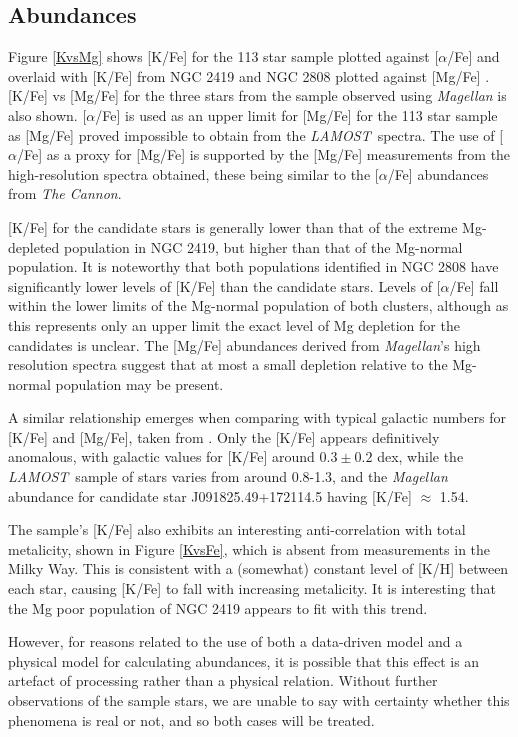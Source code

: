 \documentclass[a4paper,fleqn,usenatbib]{mnras}
\newcommand{\project}[1]{\emph{#1}}
\newcommand{\lamost}{\project{LAMOST}}
\newcommand{\tc}{\project{The Cannon}}
\begin{document}
\subsection{Abundances}

Figure \ref{KvsMg} shows [K/Fe]  for the 113 star sample plotted against $[\alpha$/Fe] and overlaid with [K/Fe] from NGC 2419 and NGC 2808 plotted against [Mg/Fe] \citep{cohenkirby2012,mucciarelli2012,mucciarelli2015}. [K/Fe] vs [Mg/Fe] for the three stars from the sample observed using \textit{Magellan} is also shown. $[\alpha$/Fe] is used as an upper limit for [Mg/Fe] for the 113 star sample as [Mg/Fe] proved impossible to obtain from the \lamost \ spectra. The use of [$\alpha$/Fe] as a proxy for [Mg/Fe] is supported by the [Mg/Fe] measurements from the high-resolution spectra obtained, these being similar to the [$\alpha$/Fe] abundances from \tc.

[K/Fe] for the candidate stars is generally lower than that of the extreme Mg-depleted population in NGC 2419, but higher than that of the Mg-normal population. It is noteworthy that both populations identified in NGC 2808 have significantly lower levels of [K/Fe] than the candidate stars.
Levels of [$\alpha$/Fe] fall within the lower limits of the Mg-normal population of both clusters, although as this represents only an upper limit the exact level of Mg depletion for the candidates is unclear. The [Mg/Fe] abundances derived from \textit{Magellan}'s high resolution spectra suggest that at most a small depletion relative to the Mg-normal population may be present.

A similar relationship emerges when comparing with typical galactic numbers for [K/Fe] and [Mg/Fe], taken from \cite{kobayashi2011}.
Only the [K/Fe] appears definitively anomalous, with galactic values for [K/Fe] around $0.3 \pm 0.2$ dex, while the \lamost \ sample of stars varies from around 0.8-1.3, and the \textit{Magellan} abundance for candidate star J091825.49+172114.5 having [K/Fe] $\approx$ 1.54.

The sample's [K/Fe] also exhibits an interesting anti-correlation with total metalicity, shown in Figure \ref{KvsFe}, which is absent from measurements in the Milky Way. This is consistent with a (somewhat) constant level of [K/H] between each star, causing [K/Fe] to fall with increasing metalicity. It is interesting that the Mg poor population of NGC 2419 appears to fit with this trend.

 However, for reasons related to the use of both a data-driven model and a physical model for calculating abundances, it is possible that this effect is an artefact of processing rather than a physical relation. Without further observations of the sample stars, we are unable to say with certainty whether this phenomena is real or not, and so both cases will be treated.
\end{document}
